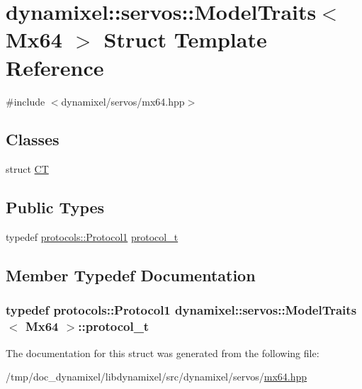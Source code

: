 \hypertarget{structdynamixel_1_1servos_1_1_model_traits_3_01_mx64_01_4}{}\section{dynamixel\+:\+:servos\+:\+:Model\+Traits$<$ Mx64 $>$ Struct Template Reference}
\label{structdynamixel_1_1servos_1_1_model_traits_3_01_mx64_01_4}


{\ttfamily \#include $<$dynamixel/servos/mx64.\+hpp$>$}

\subsection*{Classes}
\begin{DoxyCompactItemize}
\item 
struct \hyperlink{structdynamixel_1_1servos_1_1_model_traits_3_01_mx64_01_4_1_1_c_t}{CT}
\end{DoxyCompactItemize}
\subsection*{Public Types}
\begin{DoxyCompactItemize}
\item 
typedef \hyperlink{classdynamixel_1_1protocols_1_1_protocol1}{protocols\+::\+Protocol1} \hyperlink{structdynamixel_1_1servos_1_1_model_traits_3_01_mx64_01_4_ae6ab4138280d3f41efbcab9a01d345cc}{protocol\+\_\+t}
\end{DoxyCompactItemize}


\subsection{Member Typedef Documentation}
\subsubsection[{\texorpdfstring{protocol\+\_\+t}{protocol_t}}]{\setlength{\rightskip}{0pt plus 5cm}typedef {\bf protocols\+::\+Protocol1} {\bf dynamixel\+::servos\+::\+Model\+Traits}$<$ {\bf Mx64} $>$\+::{\bf protocol\+\_\+t}}\hypertarget{structdynamixel_1_1servos_1_1_model_traits_3_01_mx64_01_4_ae6ab4138280d3f41efbcab9a01d345cc}{}\label{structdynamixel_1_1servos_1_1_model_traits_3_01_mx64_01_4_ae6ab4138280d3f41efbcab9a01d345cc}


The documentation for this struct was generated from the following file\+:\begin{DoxyCompactItemize}
\item 
/tmp/doc\+\_\+dynamixel/libdynamixel/src/dynamixel/servos/\hyperlink{mx64_8hpp}{mx64.\+hpp}\end{DoxyCompactItemize}
